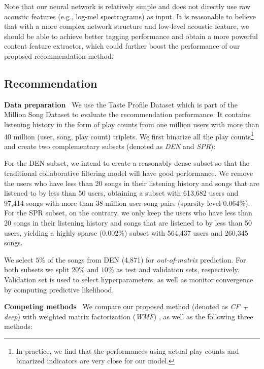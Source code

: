 Note that our neural network is relatively simple and does not directly use raw acoustic features (e.g., log-mel spectrograms) as input. It is reasonable to believe that with a more complex network structure and low-level acoustic feature, we should be able to achieve better tagging performance and obtain a more powerful content feature extractor, which could further boost the performance of our proposed recommendation method. 

 
\subsection{Recommendation}\label{sec:eval_rec}

\noindent\textbf{Data preparation}~
We use the Taste Profile Dataset which is part of the Million Song Dataset to evaluate the recommendation performance. It contains listening history in the form of play counts from one million users with more than 40 million (user, song, play count) triplets. We first binarize all the play counts\footnote{In practice, we find that the performances using actual play counts and binarized indicators are very close for our model.} and create two complementary subsets (denoted as \emph{DEN} and \emph{SPR}):

For the DEN subset, we intend to create a reasonably dense subset so that the traditional collaborative filtering model will have good performance. We remove the users who have less than 20 songs in their listening history and songs that are listened to by less than 50 users, obtaining a subset with 613,682 users and 97,414 songs with more than 38 million user-song pairs (sparsity level $0.064\%$). For the SPR subset, on the contrary, we only keep the users who have less than 20 songs in their listening history and songs that are listened to by less than 50 users, yielding a highly sparse ($0.002\%$) subset with 564,437 users and 260,345 songs.

We select $5\%$ of the songs from DEN (4,871) for \emph{out-of-matrix} prediction. For both subsets we split $20\%$ and $10\%$ as test and validation sets, respectively. Validation set is used to select hyperparameters, as well as monitor convergence by computing predictive likelihood.  

\vspace{0.1in}
\noindent\textbf{Competing methods}~
We compare our proposed method (denoted as \emph{CF + deep}) with  weighted matrix factorization (\emph{WMF}) \cite{hu2008collaborative}, as well as the following three methods: 

